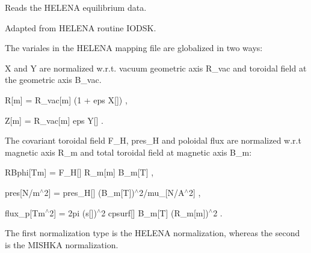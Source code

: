 Reads the H\+E\+L\+E\+NA equilibrium data. 

Adapted from H\+E\+L\+E\+NA routine {\ttfamily I\+O\+D\+SK}.

The variales in the H\+E\+L\+E\+NA mapping file are globalized in two ways\+:
\begin{DoxyItemize}
\item X and Y are normalized w.\+r.\+t. vacuum geometric axis {\ttfamily R\+\_\+vac} and toroidal field at the geometric axis {\ttfamily B\+\_\+vac}.
\item {\ttfamily  R\mbox{[}m\mbox{]} = R\+\_\+vac\mbox{[}m\mbox{]} (1 + eps X\mbox{[}\mbox{]}) },
\item {\ttfamily  Z\mbox{[}m\mbox{]} = R\+\_\+vac\mbox{[}m\mbox{]} eps Y\mbox{[}\mbox{]} }.
\end{DoxyItemize}

The covariant toroidal field {\ttfamily F\+\_\+H}, {\ttfamily pres\+\_\+H} and poloidal flux are normalized w.\+r.\+t magnetic axis {\ttfamily R\+\_\+m} and total toroidal field at magnetic axis {\ttfamily B\+\_\+m\+:} 
\begin{DoxyItemize}
\item {\ttfamily  R\+Bphi\mbox{[}Tm\mbox{]} = F\+\_\+H\mbox{[}\mbox{]} R\+\_\+m\mbox{[}m\mbox{]} B\+\_\+m\mbox{[}T\mbox{]} },
\item {\ttfamily  pres\mbox{[}N/m$^\wedge$2\mbox{]} = pres\+\_\+H\mbox{[}\mbox{]} (B\+\_\+m\mbox{[}T\mbox{]})$^\wedge$2/mu\+\_\mbox{[}N/\+A$^\wedge$2\mbox{]} },
\item {\ttfamily  flux\+\_\+p\mbox{[}Tm$^\wedge$2\mbox{]} = 2pi (s\mbox{[}\mbox{]})$^\wedge$2 cpsurf\mbox{[}\mbox{]} B\+\_\+m\mbox{[}T\mbox{]} (R\+\_\+m\mbox{[}m\mbox{]})$^\wedge$2 }.
\end{DoxyItemize}

The first normalization type is the H\+E\+L\+E\+NA normalization, whereas the second is the M\+I\+S\+H\+KA normalization.

